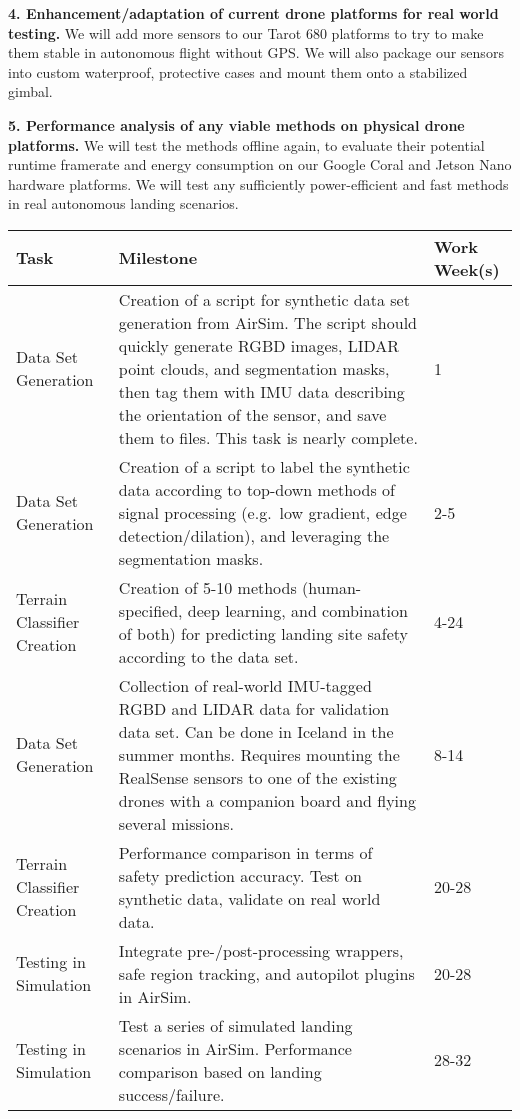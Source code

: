 \textbf{4. Enhancement/adaptation of current drone platforms for real world testing.}
We will add more sensors to our Tarot 680 platforms to try to make them stable in autonomous flight without GPS.
We will also package our sensors into custom waterproof, protective cases and mount them onto a stabilized gimbal.

\textbf{5. Performance analysis of any viable methods on physical drone platforms.}
We will test the methods offline again, to evaluate their potential runtime framerate and energy consumption
on our Google Coral and Jetson Nano hardware platforms.
We will test any sufficiently power-efficient and fast methods in real autonomous landing scenarios.

\begin{table}
    \centering
    \begin{tabular}{|p{2cm}|p{10cm}|p{2cm}|}\hline
        Task & Milestone & Work Week(s)\\\hline
        Data Set Generation & Creation of a script for synthetic data set generation from AirSim. The script should quickly generate RGBD images, LIDAR point clouds, and segmentation masks, then tag them with IMU data describing the orientation of the sensor, and save them to files. This task is nearly complete. & 1\\\hline
        Data Set Generation & Creation of a script to label the synthetic data according to top-down methods of signal processing (e.g.~low gradient, edge detection/dilation), and leveraging the segmentation masks. & 2-5\\\hline
        Terrain Classifier Creation & Creation of 5-10 methods (human-specified, deep learning, and combination of both) for predicting landing site safety according to the data set. & 4-24\\\hline
        Data Set Generation & Collection of real-world IMU-tagged RGBD and LIDAR data for validation data set. Can be done in Iceland in the summer months. Requires mounting the RealSense sensors to one of the existing drones with a companion board and flying several missions. & 8-14\\\hline
        Terrain Classifier Creation & Performance comparison in terms of safety prediction accuracy. Test on synthetic data, validate on real world data. & 20-28\\\hline
        Testing in Simulation & Integrate pre-/post-processing wrappers, safe region tracking, and autopilot plugins in AirSim. & 20-28\\\hline
        Testing in Simulation & Test a series of simulated landing scenarios in AirSim. Performance comparison based on landing success/failure. & 28-32\\\hline

\end{tabular}
\end{table}
